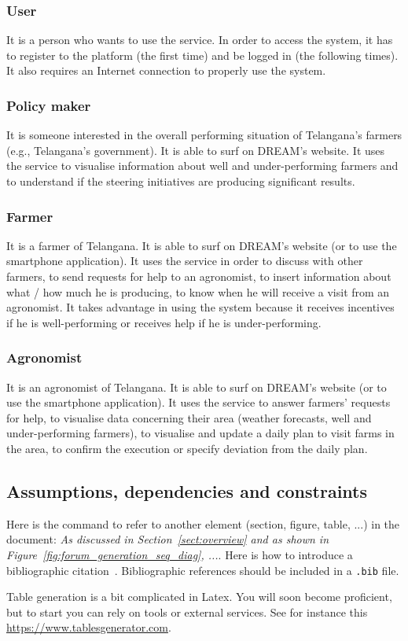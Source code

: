 \subsubsection{User}
It is a person who wants to use the service. In order to access the system, it has to register to the platform (the first time) and be logged in (the following times). It also requires an Internet connection to properly use the system.
\subsubsection{Policy maker}
It is someone interested in the overall performing situation of Telangana’s farmers (e.g., Telangana’s government). It is able to surf on DREAM’s website. It uses the service to visualise information about well and under-performing farmers and to understand if the steering initiatives are producing significant results.
\subsubsection{Farmer}
It is a farmer of Telangana. It is able to surf on DREAM’s website (or to use the smartphone application). It uses the service in order to discuss with other farmers, to send requests for help to an agronomist, to insert information about what / how much he is producing, to know when he will receive a visit from an agronomist. It takes advantage in using the system because it receives incentives if he is well-performing or receives help if he is under-performing.
\subsubsection{Agronomist}
It is an agronomist of Telangana. It is able to surf on DREAM’s website (or to use the smartphone application). It uses the service to answer farmers' requests for help, to visualise data concerning their area (weather forecasts, well and under-performing farmers), to visualise and update a daily plan to visit farms in the area, to confirm the execution or specify deviation from the daily plan.


\subsection{Assumptions, dependencies and constraints}

Here is the command to refer to another element (section, figure, table, ...) in the document: \emph{As discussed in Section~\ref{sect:overview} and as shown in Figure~\ref{fig:forum_generation_seq_diag}, ...}. Here is how to introduce a bibliographic citation~\cite{UNDP_GitHub}. Bibliographic references should be included in a \texttt{.bib} file. 

Table generation is a bit complicated in Latex. You will soon become proficient, but to start you can rely on tools or external services. See for instance this \href{https://www.tablesgenerator.com}{https://www.tablesgenerator.com}. 
